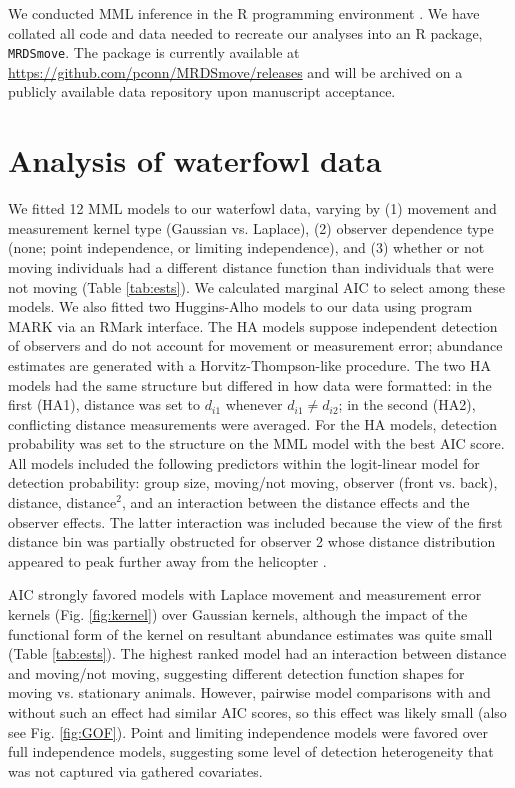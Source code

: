 \documentclass[12pt,fleqn]{article}
\begin{document}
We conducted MML inference in the R programming environment \citep{RTeam2016}.  We have collated all code and data needed to recreate our analyses into an R package, \texttt{MRDSmove}. The package is currently available at \url{https://github.com/pconn/MRDSmove/releases} and will be archived on a publicly available data repository upon manuscript acceptance.

\section{Analysis of waterfowl data} \label{sec:data}

We fitted 12 MML models to our waterfowl data, varying by (1) movement and measurement kernel type (Gaussian vs. Laplace), (2) observer dependence type (none; point independence, or limiting independence), and (3) whether or not moving individuals had a different distance function than individuals that were not moving (Table \ref{tab:ests}).  We calculated marginal AIC to select among these models.  We also fitted two Huggins-Alho
\citep[HA;][]{Huggins1989,Alho1990} models to our data using program MARK \citep{WhiteBurnham1999} via an RMark \citep{Laake2013} interface. The HA models suppose independent detection of observers and do not account for movement or measurement error; abundance estimates are generated with a Horvitz-Thompson-like procedure. The two HA models had the same structure but differed in how data were formatted: in the first (HA1), distance was set to $d_{i1}$ whenever $d_{i1}\ne d_{i2}$; in the second (HA2), conflicting distance measurements were averaged.
For the HA models, detection probability was set to the structure on the MML model with the best AIC score.
All models included the following predictors within the logit-linear model for detection probability: group size, moving/not moving, observer (front vs. back), distance, $\text{distance}^2$, and an interaction between the distance effects and the observer effects.  The latter interaction was included because the view of the first distance bin was partially obstructed for observer 2 whose distance distribution appeared to peak further away from the helicopter \citep[see][]{AlisauskasConn2017}.

AIC strongly favored models with Laplace movement and measurement error kernels (Fig. \ref{fig:kernel}) over Gaussian kernels, although the impact of the functional form of the kernel on resultant abundance estimates was quite small (Table \ref{tab:ests}).  The highest ranked model had an interaction between distance and moving/not moving, suggesting different detection function shapes for moving vs. stationary animals. However, pairwise model comparisons with and without such an effect had similar AIC scores, so this effect was likely small (also see Fig. \ref{fig:GOF}). Point and limiting independence models were favored over full independence models, suggesting some level of detection heterogeneity that was not captured via gathered covariates.
\end{document}
